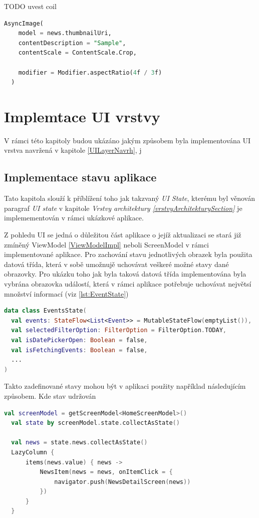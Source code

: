 TODO uvest coil
\begin{lstlisting}[caption={Coil}, label={lst:Coil3}, language=SQL]
  AsyncImage(
    model = news.thumbnailUri,
    contentDescription = "Sample",
    contentScale = ContentScale.Crop,

    modifier = Modifier.aspectRatio(4f / 3f)
  )
\end{lstlisting}


\section{Implemtace UI vrstvy} \label{UILayerImpl}
V rámci této kapitoly budou ukázáno jakým způsobem byla implementována UI vrstva navržená v kapitole \ref{UILayerNavrh}, j

\subsection{Implementace stavu aplikace} \label{stateHandlingImpl}
Tato kapitola slouží k příblížení toho jak takzvaný \textit{UI State}, kterému byl věnován paragraf \textit{UI state} v 
kapitole \textit{Vrstvy architektury \ref{vrstvyArchitekturySection} } je implemementován v rámci ukázkové aplikace.

Z pohledu UI se jedná o důležitou část aplikace o jejíž aktualizaci se stará již zmíněný ViewModel \ref{ViewModelImpl} neboli ScreenModel v rámci
implementované aplikace. 
Pro zachování stavu jednotlivých obrazek byla použita datová třída, která v sobě umožnujě uchovávat veškeré možné stavy dané obrazovky.
Pro ukázku toho jak byla taková datová třída implementována byla vybrána obrazovka událostí, která v rámci aplikace potřebuje 
uchovávat největsí množství informací (viz \ref{lst:EventState})

\begin{lstlisting}[caption={Event State katalog}, label={lst:EventState}, language=Kotlin]
data class EventsState(
  val events: StateFlow<List<Event>> = MutableStateFlow(emptyList()),
  val selectedFilterOption: FilterOption = FilterOption.TODAY,
  val isDatePickerOpen: Boolean = false,
  val isFetchingEvents: Boolean = false,
  ...
)
\end{lstlisting}

Takto zadefinované stavy mohou být v aplikaci použity například následujícím způsobem. Kde stav udržován 

\begin{lstlisting}[caption={Použití stavu v aplikaci}, label={lst:StateImpl}, language=Kotlin]
  val screenModel = getScreenModel<HomeScreenModel>()
  val state by screenModel.state.collectAsState()

  val news = state.news.collectAsState()
  LazyColumn {
      items(news.value) { news ->
          NewsItem(news = news, onItemClick = {
              navigator.push(NewsDetailScreen(news))
          })
      }
  }
\end{lstlisting}

